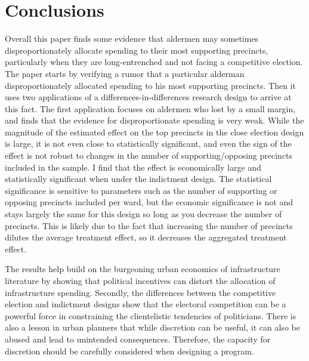 \section{Conclusions}\label{sec:conclusions}

Overall this paper finds some evidence that aldermen may sometimes disproportionately allocate spending to their most supporting precincts, particularly when they are long-entrenched and not facing a competitive election.
The paper starts by verifying a rumor that a particular alderman disproportionately allocated spending to his most supporting precincts.
Then it uses two applications of a differences-in-differences research design to arrive at this fact.
The first application focuses on aldermen who lost by a small margin, and finds that the evidence for disproportionate spending is very weak.
While the magnitude of the estimated effect on the top precincts in the close election design is large, it is not even close to statistically significant, and even the sign of the effect is not robust to changes in the number of supporting/opposing precincts included in the sample.
I find that the effect is economically large and statistically significant when under the indictment design.
The statistical significance is sensitive to parameters such as the number of supporting or opposing precincts included per ward, but the economic significance is not and stays largely the same for this design so long as you decrease the number of precincts.
This is likely due to the fact that increasing the number of precincts dilutes the average treatment effect, so it decreases the aggregated treatment effect.

The results help build on the burgeoning urban economics of infrastructure literature by showing that political incentives can distort the allocation of infrastructure spending.
Secondly, the differences between the competitive election and indictment designs show that the electoral competition can be a powerful force in constraining the clientelistic tendencies of politicians.
There is also a lesson in urban planners that while discretion can be useful, it can also be abused and lead to unintended consequences.
Therefore, the capacity for discretion should be carefully considered when designing a program.
